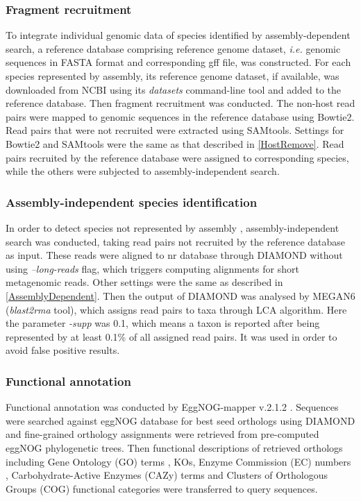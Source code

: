 \documentclass[11pt]{article}
\begin{document}
    \subsubsection{Fragment recruitment}
    To integrate individual genomic data of species identified by assembly-dependent search, a reference database comprising reference genome dataset, \textit{i.e.} genomic sequences in FASTA format and corresponding gff file, was constructed. 
    For each species represented by assembly, its reference genome dataset, if available, was downloaded from NCBI using its \textit{datasets} command-line tool and added to the reference database. 
    \newline
    Then fragment recruitment was conducted. 
    The non-host read pairs were mapped to genomic sequences in the reference database using Bowtie2. 
    Read pairs that were not recruited were extracted using SAMtools. 
    Settings for Bowtie2 and SAMtools were the same as that described in \ref{HostRemove}. 
    Read pairs recruited by the reference database were assigned to corresponding species, while the others were subjected to assembly-independent search.

    \subsubsection{Assembly-independent species identification}
    In order to detect species not represented by assembly \citep{sharon2015accurate,vollmers2017comparing}, assembly-independent search was conducted, taking read pairs not recruited by the reference database as input. 
    These reads were aligned to nr database through DIAMOND without using \textit{--long-reads} flag, which triggers computing alignments for short metagenomic reads. 
    Other settings were the same as described in \ref{AssemblyDependent}. 
    Then the output of DIAMOND was analysed by MEGAN6 (\textit{blast2rma} tool), which assigns read pairs to taxa through LCA algorithm. 
    Here the parameter \textit{-supp} was 0.1, which means a taxon is reported after being represented by at least 0.1\% of all assigned read pairs. 
    It was used in order to avoid false positive results. 

    \subsubsection{Functional annotation}
    Functional annotation was conducted by EggNOG-mapper v.2.1.2 \citep{huerta2017fast}. 
    Sequences were searched against eggNOG database \citep{huerta2019eggnog} for best seed orthologs using DIAMOND and fine-grained orthology assignments were retrieved from pre-computed eggNOG phylogenetic trees. 
    Then functional descriptions of retrieved orthologs including Gene Ontology (GO) terms \citep{gene2004gene}, KOs, Enzyme Commission (EC) numbers \cite{webb1992enzyme}, Carbohydrate-Active Enzymes (CAZy) terms \cite{cantarel2009carbohydrate} and Clusters of Orthologous Groups (COG) functional categories \cite{tatusov2000cog} were transferred to query sequences.
\end{document}
